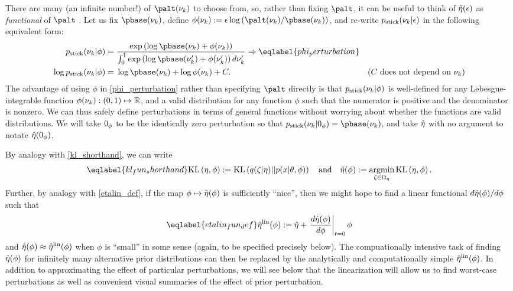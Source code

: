 There are many (an infinite number!) of $\palt(\nuk)$ to choose from, so, rather
than fixing $\palt$, it can be useful to think of $\hat\eta(\epsilon)$ as {\em
functional} of $\palt$ \citep{gustafson:1996:local}.  Let us fix $\pbase(\nuk)$,
define $\phi(\nuk) := \epsilon \log \left(\palt(\nuk) / \pbase(\nuk)\right)$,
and re-write $p_{\mathrm{stick}}(\nu_{k} \vert \epsilon)$ in the following equivalent form:
%
\begin{align}
%
\pstick(\nuk \vert \phi) ={}&
\frac{\exp\left(\log \pbase(\nuk) + \phi(\nuk)\right)}
     {\int_0^1 \exp\left(\log \pbase(\nuk') + \phi(\nuk')\right) d\nuk'}
        \Rightarrow \eqlabel{phi_perturbation}\\
\log \pstick(\nuk \vert \phi) ={}&
    \log \pbase(\nuk) + \log \phi(\nuk) + \const.
    & \constdesc{\nuk} \nonumber
%
\end{align}
%
The advantage of using $\phi$ in \eqref{phi_perturbation} rather than specifying
$\palt$ directly is that $p_{\mathrm{stick}}(\nu_{k} \vert \phi)$ is well-defined for any
Lebesgue-integrable function $\phi(\nu_{k}): (0,1)\mapsto\mathbb{R}$, and a valid
distribution for any function $\phi$ such that the numerator is positive and the
denominator is nonzero.  We can thus safely define perturbations in terms of
general functions without worrying about whether the functions are valid
distributions. We will take $0_\phi$ to be the identically zero perturbation so
that $\pstick(\nuk \vert \phiz) = \pbase(\nuk)$, and take $\hat\eta$ with no
argument to notate $\hat\eta(0_\phi)$.

By analogy with \eqref{kl_shorthand}, we can write
%
\begin{align}\eqlabel{kl_fun_shorthand}
%
\KL{\eta, \phi} := \KL{\q(\zeta \vert \eta) || p(\x \vert \theta, \phi)}
\mathand
\etaopt(\phi) := \argmin_{\zeta \in \etadom} \KL{\eta, \phi}.
%
\end{align}
%
Further, by analogy with \eqref{etalin_def}, if the map $\phi \mapsto
\hat\eta(\phi)$ is sufficiently ``nice'', then we might hope to find a linear
functional $d\hat\eta(\phi) / d\phi$ such that
%
\begin{align}\eqlabel{etalin_fun_def}
%
\etalin(\phi) := \etaopt + \fracat{d \etaopt(\phi)}{d \phi}{\t=0} \phi
%
\end{align}
%
and $\hat\eta(\phi) \approx \hat\eta^{\mathrm{lin}}(\phi)$ when $\phi$ is ``small'' in some sense
(again, to be specified precisely below).  The compuationally intensive task of
finding $\hat\eta(\phi)$ for infinitely many alternative prior distributions can
then be replaced by the analytically and computationally simple $\hat\eta^{\mathrm{lin}}(\phi)$.
In addition to approximating the effect of particular perturbations, we will see
below that the linearization will allow us to find worst-case perturbations as
well as convenient visual summaries of the effect of prior perturbation.

